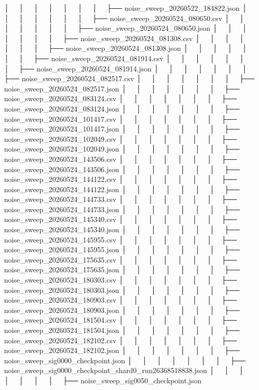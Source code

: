 │   │       │   │   │   │   │   ├── noise_sweep_20260522_184822.json
│   │       │   │   │   │   │   ├── noise_sweep_20260524_080650.csv
│   │       │   │   │   │   │   ├── noise_sweep_20260524_080650.json
│   │       │   │   │   │   │   ├── noise_sweep_20260524_081308.csv
│   │       │   │   │   │   │   ├── noise_sweep_20260524_081308.json
│   │       │   │   │   │   │   ├── noise_sweep_20260524_081914.csv
│   │       │   │   │   │   │   ├── noise_sweep_20260524_081914.json
│   │       │   │   │   │   │   ├── noise_sweep_20260524_082517.csv
│   │       │   │   │   │   │   ├── noise_sweep_20260524_082517.json
│   │       │   │   │   │   │   ├── noise_sweep_20260524_083124.csv
│   │       │   │   │   │   │   ├── noise_sweep_20260524_083124.json
│   │       │   │   │   │   │   ├── noise_sweep_20260524_101417.csv
│   │       │   │   │   │   │   ├── noise_sweep_20260524_101417.json
│   │       │   │   │   │   │   ├── noise_sweep_20260524_102049.csv
│   │       │   │   │   │   │   ├── noise_sweep_20260524_102049.json
│   │       │   │   │   │   │   ├── noise_sweep_20260524_143506.csv
│   │       │   │   │   │   │   ├── noise_sweep_20260524_143506.json
│   │       │   │   │   │   │   ├── noise_sweep_20260524_144122.csv
│   │       │   │   │   │   │   ├── noise_sweep_20260524_144122.json
│   │       │   │   │   │   │   ├── noise_sweep_20260524_144733.csv
│   │       │   │   │   │   │   ├── noise_sweep_20260524_144733.json
│   │       │   │   │   │   │   ├── noise_sweep_20260524_145340.csv
│   │       │   │   │   │   │   ├── noise_sweep_20260524_145340.json
│   │       │   │   │   │   │   ├── noise_sweep_20260524_145955.csv
│   │       │   │   │   │   │   ├── noise_sweep_20260524_145955.json
│   │       │   │   │   │   │   ├── noise_sweep_20260524_175635.csv
│   │       │   │   │   │   │   ├── noise_sweep_20260524_175635.json
│   │       │   │   │   │   │   ├── noise_sweep_20260524_180303.csv
│   │       │   │   │   │   │   ├── noise_sweep_20260524_180303.json
│   │       │   │   │   │   │   ├── noise_sweep_20260524_180903.csv
│   │       │   │   │   │   │   ├── noise_sweep_20260524_180903.json
│   │       │   │   │   │   │   ├── noise_sweep_20260524_181504.csv
│   │       │   │   │   │   │   ├── noise_sweep_20260524_181504.json
│   │       │   │   │   │   │   ├── noise_sweep_20260524_182102.csv
│   │       │   │   │   │   │   ├── noise_sweep_20260524_182102.json
│   │       │   │   │   │   │   ├── noise_sweep_sig0000_checkpoint.json
│   │       │   │   │   │   │   ├── noise_sweep_sig0000_checkpoint_shard0_run26368518838.json
│   │       │   │   │   │   │   ├── noise_sweep_sig0050_checkpoint.json
